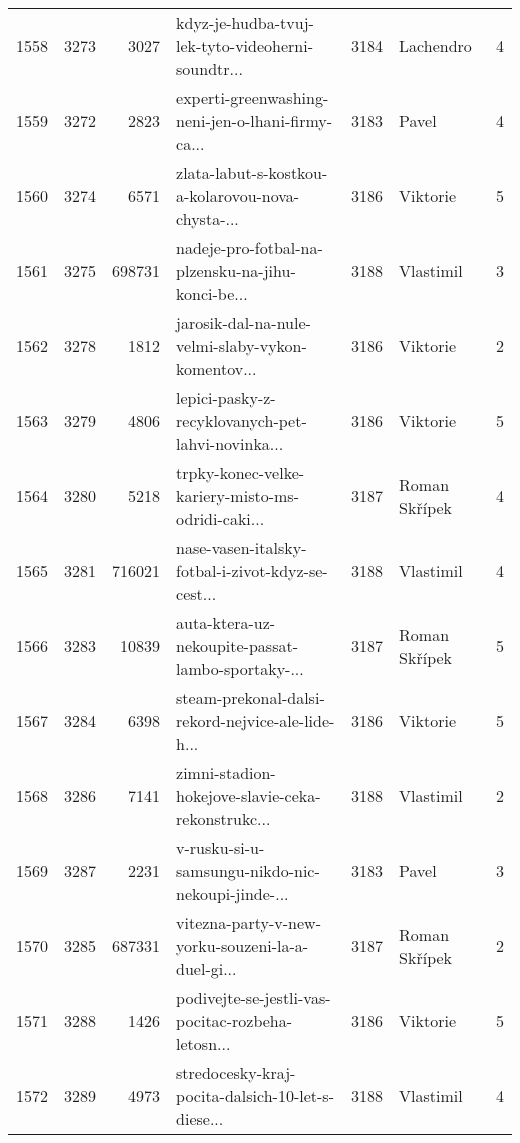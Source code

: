 \begin{tabular}{lrrlrlr}
1558 &       3273 &     3027 &  kdyz-je-hudba-tvuj-lek-tyto-videoherni-soundtr... &     3184 &                    Lachendro &               4 \\
1559 &       3272 &     2823 &  experti-greenwashing-neni-jen-o-lhani-firmy-ca... &     3183 &                        Pavel &               4 \\
1560 &       3274 &     6571 &  zlata-labut-s-kostkou-a-kolarovou-nova-chysta-... &     3186 &                     Viktorie &               5 \\
1561 &       3275 &   698731 &  nadeje-pro-fotbal-na-plzensku-na-jihu-konci-be... &     3188 &                    Vlastimil &               3 \\
1562 &       3278 &     1812 &  jarosik-dal-na-nule-velmi-slaby-vykon-komentov... &     3186 &                     Viktorie &               2 \\
1563 &       3279 &     4806 &  lepici-pasky-z-recyklovanych-pet-lahvi-novinka... &     3186 &                     Viktorie &               5 \\
1564 &       3280 &     5218 &  trpky-konec-velke-kariery-misto-ms-odridi-caki... &     3187 &                Roman Skřípek &               4 \\
1565 &       3281 &   716021 &  nase-vasen-italsky-fotbal-i-zivot-kdyz-se-cest... &     3188 &                    Vlastimil &               4 \\
1566 &       3283 &    10839 &  auta-ktera-uz-nekoupite-passat-lambo-sportaky-... &     3187 &                Roman Skřípek &               5 \\
1567 &       3284 &     6398 &  steam-prekonal-dalsi-rekord-nejvice-ale-lide-h... &     3186 &                     Viktorie &               5 \\
1568 &       3286 &     7141 &  zimni-stadion-hokejove-slavie-ceka-rekonstrukc... &     3188 &                    Vlastimil &               2 \\
1569 &       3287 &     2231 &  v-rusku-si-u-samsungu-nikdo-nic-nekoupi-jinde-... &     3183 &                        Pavel &               3 \\
1570 &       3285 &   687331 &  vitezna-party-v-new-yorku-souzeni-la-a-duel-gi... &     3187 &                Roman Skřípek &               2 \\
1571 &       3288 &     1426 &  podivejte-se-jestli-vas-pocitac-rozbeha-letosn... &     3186 &                     Viktorie &               5 \\
1572 &       3289 &     4973 &  stredocesky-kraj-pocita-dalsich-10-let-s-diese... &     3188 &                    Vlastimil &               4 \\

\end{tabular}
